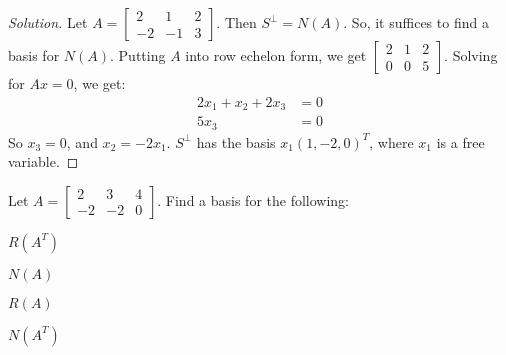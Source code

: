 \documentclass[../main.tex]{subfiles}
\begin{document}
\begin{proof}[Solution]
Let $A = \begin{bmatrix} 2 & 1 & 2 \\ -2 & -1 & 3\end{bmatrix}$. Then $S^{\perp} = N(A)$. So, it suffices to find a basis for $N(A)$. Putting $A$ into row echelon form, we get $\begin{bmatrix} 2 & 1 & 2 \\ 0 & 0 & 5 \end{bmatrix}$. Solving for $Ax = 0$, we get:
\begin{align*}
     2x_1 + x_2 + 2x_3 &= 0\\ 
     5x_3 &= 0    
\end{align*}
So $x_3 = 0$, and $x_2 = - 2x_1$. $S^{\perp}$ has the basis $x_1(1,-2,0)^T$, where $x_1$ is a free variable.
\end{proof}
%
\begin{problem}
Let $A = \begin{bmatrix} 2 & 3 & 4 \\ -2 & -2 & 0 \end{bmatrix}$. Find a basis for the following:
\begin{enumerate}
\begin{multicols}{4}
\item $R(A^T)$
\item $N(A)$
\item $R(A)$
\item $N(A^T)$
\end{multicols}
\end{enumerate}
\end{problem}
\end{document}
